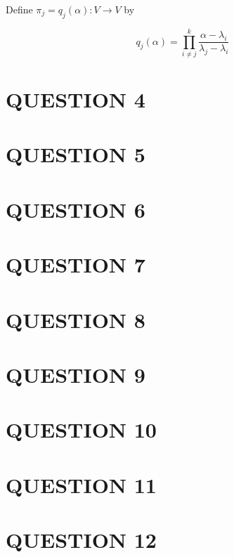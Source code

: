 \documentclass[a4paper]{article}
\begin{document}
Define $ \pi_{j} = q_{j}(\alpha) : V \to V $ by

\[ q_{j}(\alpha) = \prod_{i \neq j}^{k}  \frac{\alpha - \lambda_{i}}{\lambda_{j} - \lambda_{i}} \]

\section{QUESTION 4}
\section{QUESTION 5}
\section{QUESTION 6}
\section{QUESTION 7}
\section{QUESTION 8}
\section{QUESTION 9}
\section{QUESTION 10}
\section{QUESTION 11}
\section{QUESTION 12}

	
	
	
\end{document}
